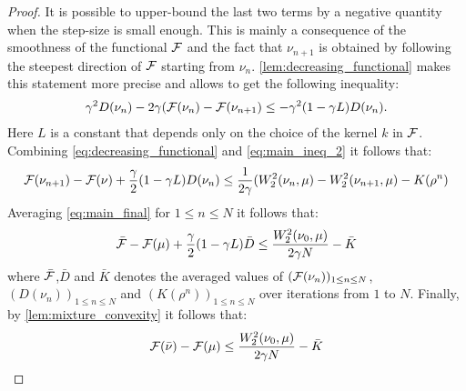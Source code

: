 \begin{proof}
It is possible to upper-bound the last two terms by a negative quantity when the step-size is small enough. This is mainly a consequence of the smoothness of the functional ${{\mathcal F}}$ and the fact that $\nu_{n+1}$ is obtained by following the steepest direction of ${{\mathcal F}}$ starting from $\nu_n$. \cref{lem:decreasing_functional} makes this statement more precise and allows to get the following inequality:
\begin{align}
	\gamma^2 D(\nu_n) -2\gamma ({{\mathcal F}}(\nu_n)-{{\mathcal F}}(\nu_{n+1})\leq -\gamma^2 (1-\gamma L)D(\nu_n).
	\label{eq:decreasing_functional}
\end{align}
Here $L$ is a constant that depends only on the choice of the kernel $k$ in ${{\mathcal F}}$. Combining \cref{eq:decreasing_functional} and \cref{eq:main_ineq_2} it follows that:
\begin{align}
{{\mathcal F}}(\nu_{n+1})-{{\mathcal F}}(\nu)+\frac{\gamma}{2}(1-\gamma L)D(\nu_n)
\leq 
\frac{1}{2\gamma} (W_2^2(\nu_n,\mu)-W_2^2(\nu_{n+1},\mu)-K(\rho^n)
\label{eq:main_final}
\end{align}
Averaging \cref{eq:main_final} for $1\leq n\leq N$ it follows that:
\begin{align}
	\bar{{{\mathcal F}}}-{{\mathcal F}}(\mu)+\frac{\gamma}{2}(1-\gamma L)\bar{D} \leq \frac{W_2^2(\nu_0,\mu)}{2 \gamma N} -\bar{K}
\end{align}
where $\bar{{{\mathcal F}}}$,$\bar{D}$ and $\bar{K}$ denotes the averaged values of $({{\mathcal F}}(\nu_n))_{1\leq n \leq N}$, $(D(\nu_n))_{1\leq n \leq N}$  and $(K(\rho^n))_{1\leq n \leq N}$ over iterations from $1$ to $N$. Finally, by \cref{lem:mixture_convexity} it follows that:
\begin{align}
{{\mathcal F}}(\bar{\nu})-{{\mathcal F}}(\mu)\leq  \frac{W_2^2(\nu_0,\mu)}{2 \gamma N} -\bar{K}
\end{align}

\end{proof}




